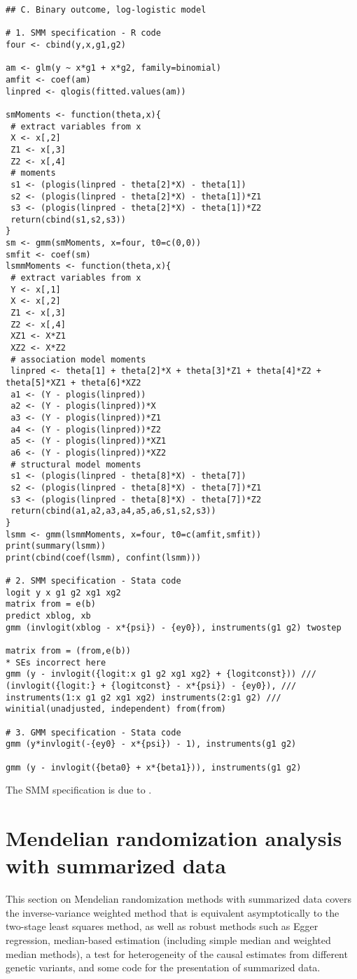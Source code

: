 \documentclass[a4paper,12pt]{article} %
\begin{document}
\begin{lstlisting}
## C. Binary outcome, log-logistic model

# 1. SMM specification - R code
four <- cbind(y,x,g1,g2)

am <- glm(y ~ x*g1 + x*g2, family=binomial)
amfit <- coef(am)
linpred <- qlogis(fitted.values(am))

smMoments <- function(theta,x){
 # extract variables from x
 X <- x[,2]
 Z1 <- x[,3]
 Z2 <- x[,4]
 # moments
 s1 <- (plogis(linpred - theta[2]*X) - theta[1])
 s2 <- (plogis(linpred - theta[2]*X) - theta[1])*Z1
 s3 <- (plogis(linpred - theta[2]*X) - theta[1])*Z2
 return(cbind(s1,s2,s3))
}
sm <- gmm(smMoments, x=four, t0=c(0,0))
smfit <- coef(sm)
lsmmMoments <- function(theta,x){
 # extract variables from x
 Y <- x[,1]
 X <- x[,2]
 Z1 <- x[,3]
 Z2 <- x[,4]
 XZ1 <- X*Z1
 XZ2 <- X*Z2
 # association model moments
 linpred <- theta[1] + theta[2]*X + theta[3]*Z1 + theta[4]*Z2 + theta[5]*XZ1 + theta[6]*XZ2
 a1 <- (Y - plogis(linpred))
 a2 <- (Y - plogis(linpred))*X
 a3 <- (Y - plogis(linpred))*Z1
 a4 <- (Y - plogis(linpred))*Z2
 a5 <- (Y - plogis(linpred))*XZ1
 a6 <- (Y - plogis(linpred))*XZ2
 # structural model moments
 s1 <- (plogis(linpred - theta[8]*X) - theta[7])
 s2 <- (plogis(linpred - theta[8]*X) - theta[7])*Z1
 s3 <- (plogis(linpred - theta[8]*X) - theta[7])*Z2
 return(cbind(a1,a2,a3,a4,a5,a6,s1,s2,s3))
}
lsmm <- gmm(lsmmMoments, x=four, t0=c(amfit,smfit))
print(summary(lsmm))
print(cbind(coef(lsmm), confint(lsmm)))

# 2. SMM specification - Stata code
logit y x g1 g2 xg1 xg2
matrix from = e(b)
predict xblog, xb
gmm (invlogit(xblog - x*{psi}) - {ey0}), instruments(g1 g2) twostep

matrix from = (from,e(b))
* SEs incorrect here
gmm (y - invlogit({logit:x g1 g2 xg1 xg2} + {logitconst})) ///
(invlogit({logit:} + {logitconst} - x*{psi}) - {ey0}), ///
instruments(1:x g1 g2 xg1 xg2) instruments(2:g1 g2) ///
winitial(unadjusted, independent) from(from)

# 3. GMM specification - Stata code
gmm (y*invlogit(-{ey0} - x*{psi}) - 1), instruments(g1 g2)

gmm (y - invlogit({beta0} + x*{beta1})), instruments(g1 g2)
\end{lstlisting}

The SMM specification is due to \cite{vansteelandt2003}.

\clearpage

\section{Mendelian randomization analysis with summarized data}
This section on Mendelian randomization methods with summarized data covers the inverse-variance weighted method that is equivalent asymptotically to the two-stage least squares method, as well as robust methods such as Egger regression, median-based estimation (including simple median and weighted median methods), a test for heterogeneity of the causal estimates from different genetic variants, and some code for the presentation of summarized data.
\end{document}
